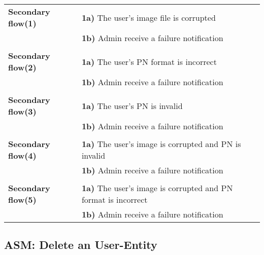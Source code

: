 \documentclass[a4paper,11pt]{article}
\begin{document}
\begin{tabular}{|p{3.5cm}|p{11.5cm}|}
    \textbf{Secondary flow(1)} & 
    \textbf{1a)} The user's image file is corrupted \\&
    \textbf{1b)} Admin receive a failure notification
     
    \\ \hline \rowcolor{Gray} & \\ \hline 
     
    \textbf{Secondary flow(2)} & 
    \textbf{1a)} The user's PN format is incorrect \\&
    \textbf{1b)} Admin receive a failure notification
    
   \\ \hline \rowcolor{Gray} & \\ \hline
    
    \textbf{Secondary flow(3)} & 
    \textbf{1a)} The user's PN is invalid \\&
    \textbf{1b)} Admin receive a failure notification
    
    \\ \hline \rowcolor{Gray} & \\ \hline
    
    \textbf{Secondary flow(4)} & 
    \textbf{1a)} The user's image is corrupted and PN is invalid\\&
    \textbf{1b)} Admin receive a failure notification
    
    \\ \hline \rowcolor{Gray} & \\ \hline
    
    \textbf{Secondary flow(5)} & 
    \textbf{1a)} The user's image is corrupted and PN format is incorrect\\&
    \textbf{1b)} Admin receive a failure notification
    \\\hline 
\end{tabular}


\newpage
\noindent

\subsection{ASM: Delete an User-Entity}
\end{document}

